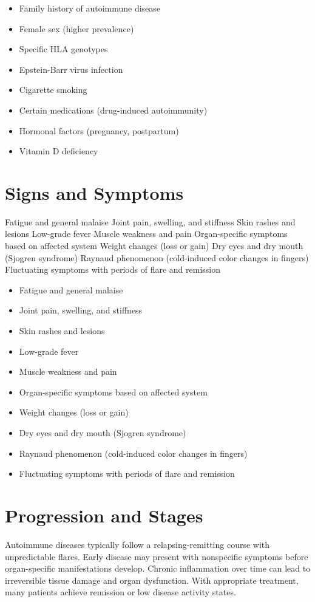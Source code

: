 \begin{itemize}[noitemsep]
  \item Family history of autoimmune disease
  \item Female sex (higher prevalence)
  \item Specific HLA genotypes
  \item Epstein-Barr virus infection
  \item Cigarette smoking
  \item Certain medications (drug-induced autoimmunity)
  \item Hormonal factors (pregnancy, postpartum)
  \item Vitamin D deficiency
\end{itemize}
\section{Signs and Symptoms}
Fatigue and general malaise Joint pain, swelling, and stiffness Skin rashes and lesions Low-grade fever Muscle weakness and pain Organ-specific symptoms based on affected system Weight changes (loss or gain) Dry eyes and dry mouth (Sjogren syndrome) Raynaud phenomenon (cold-induced color changes in fingers) Fluctuating symptoms with periods of flare and remission

\begin{itemize}[noitemsep]
  \item Fatigue and general malaise
  \item Joint pain, swelling, and stiffness
  \item Skin rashes and lesions
  \item Low-grade fever
  \item Muscle weakness and pain
  \item Organ-specific symptoms based on affected system
  \item Weight changes (loss or gain)
  \item Dry eyes and dry mouth (Sjogren syndrome)
  \item Raynaud phenomenon (cold-induced color changes in fingers)
  \item Fluctuating symptoms with periods of flare and remission
\end{itemize}
\section{Progression and Stages}
Autoimmune diseases typically follow a relapsing-remitting course with unpredictable flares. Early disease may present with nonspecific symptoms before organ-specific manifestations develop. Chronic inflammation over time can lead to irreversible tissue damage and organ dysfunction. With appropriate treatment, many patients achieve remission or low disease activity states.
